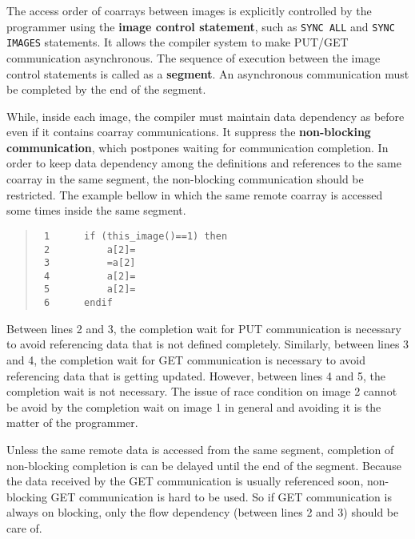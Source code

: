 The access order of coarrays between images is explicitly controlled by the 
programmer using the {\bf image control statement}, 
such as {\tt SYNC ALL} and {\tt SYNC IMAGES} statements. 
It allows the compiler system to make PUT/GET communication asynchronous.
The sequence of execution between the image control statements is called 
as a {\bf segment}.
An asynchronous communication must be completed by the end of the segment.

While, inside each image, the compiler must maintain data dependency 
as before even if it contains coarray communications.
It suppress the {\bf non-blocking communication},
which postpones waiting for communication completion.
In order to keep data dependency among the definitions and references to the same 
coarray in the same segment, the non-blocking communication should be restricted.
The example bellow in which the same remote coarray is accessed some times 
inside the same segment.
\begin{quote}
\begin{verbatim}
 1      if (this_image()==1) then
 2          a[2]=
 3          =a[2]
 4          a[2]=
 5          a[2]=
 6      endif
\end{verbatim}
\end{quote}
Between lines 2 and 3, the completion wait for PUT communication is necessary
to avoid referencing data that is not defined completely.
Similarly, between lines 3 and 4, the completion wait for GET communication is 
necessary to avoid referencing data that is getting updated.
However, between lines 4 and 5, the completion wait is not necessary.
The issue of race condition on image 2 cannot be avoid by the completion wait
on image 1 in general and avoiding it is the matter of the programmer.

\requirement
Unless the same remote data is accessed from the same segment, 
completion of non-blocking completion is can be delayed until the end of the segment.
Because the data received by the GET communication is usually referenced soon, 
non-blocking GET communication is hard to be used. So if GET communication is
always on blocking, only the flow dependency (between lines 2 and 3) should be care of.


